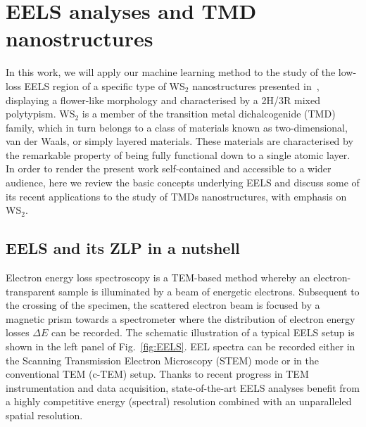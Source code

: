 \section{EELS analyses and TMD nanostructures}
\label{sec:tmdeels}

In this work, we will apply our machine learning method to the study
of the low-loss EELS region of a specific type of WS$_2$ nanostructures presented in~\cite{SabryaWS2},
displaying a flower-like morphology and characterised by  a 2H/3R mixed polytypism.
%
WS$_2$ is a member of the transition metal dichalcogenide (TMD) family, which in turn
belongs to a class of materials known as two-dimensional, van der Waals, or simply layered materials.
%
These materials are
characterised by the remarkable property of being fully functional down to a single atomic layer.
%
In order to render the present work self-contained and accessible to a wider audience,
here we review the basic concepts underlying  EELS
and discuss some of its recent applications to the study of TMDs nanostructures, with emphasis
on WS$_2$.

\subsection{EELS and its ZLP in a nutshell}
\label{sec:eels}

Electron energy loss spectroscopy is a TEM-based method
whereby an electron-transparent sample is illuminated by a 
beam of energetic electrons.
%
Subsequent to the crossing of
the specimen, the scattered electron beam is focused by a magnetic prism
towards a spectrometer where the distribution of electron energy losses $\Delta E$ can be recorded.
%
The schematic illustration of a typical EELS setup is shown in the left panel of Fig.~\ref{fig:EELS}.
%
EEL spectra can be recorded either in the Scanning Transmission Electron Microscopy (STEM) mode
or in the conventional TEM (c-TEM) setup.
%
Thanks to recent progress in TEM instrumentation and data acquisition, state-of-the-art EELS analyses benefit from
a highly competitive energy (spectral) resolution combined with an unparalleled spatial resolution.

